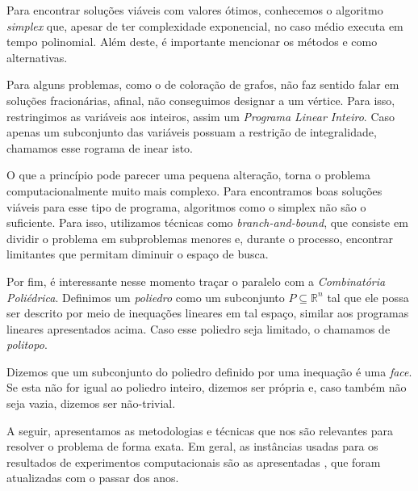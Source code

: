\documentclass[11pt]{article}
\providecommand{\DIFaddtex}[1]{{\protect\color{blue}{#1}}} %
\providecommand{\DIFaddbegin}{} %
\providecommand{\DIFaddend}{} %
\providecommand{\DIFadd}[1]{\texorpdfstring{\DIFaddtex{#1}}{#1}} %
\newcommand{\DIFaddincludegraphics}[2][]{{\color{blue}\fbox{\DIFOincludegraphics[#1]{#2}}}} %
\DeclareRobustCommand{\DIFaddbegin}{\DIFOaddbegin \let\includegraphics\DIFaddincludegraphics} %
\DeclareRobustCommand{\DIFaddend}{\DIFOaddend \let\includegraphics\DIFOincludegraphics} %
\begin{document}
Para encontrar soluções viáveis com valores ótimos, conhecemos o algoritmo \emph{simplex} que, apesar de ter complexidade exponencial, no caso médio executa em tempo polinomial\DIFaddbegin \DIFadd{~}\DIFaddend \autocite{Borgwardt1986SimplexMethodAlgorithms}.
Além deste, é importante mencionar os métodos  \DIFaddbegin \DIFadd{dos pontos interiores }\DIFaddend \autocite{Karmarkar1984newpolynomialtime} e  \DIFaddbegin \DIFadd{elipsoide~}\DIFaddend \autocite{Bland1981FeatureArticleTheEllipsoid} como alternativas.

Para alguns problemas, como o de coloração de grafos, não faz sentido falar em soluções fracionárias, afinal, não conseguimos designar \DIFaddbegin \DIFadd{``meia cor'' }\DIFaddend a um vértice.
Para isso, restringimos as variáveis aos inteiros,  \DIFaddbegin \DIFadd{tornando-o }\DIFaddend assim um \emph{Programa Linear Inteiro}. Caso apenas um subconjunto das variáveis possuam a restrição de integralidade, chamamos esse \DIFaddbegin\DIFadd{P}\DIFaddend rograma de \DIFaddbegin\DIFadd{L}\DIFaddend inear \DIFaddbegin\DIFadd{M}\DIFaddend isto.

O que a princípio pode parecer uma pequena alteração, torna o problema computacionalmente muito mais complexo.
Para encontramos boas soluções viáveis para esse tipo de programa, algoritmos como o simplex não são o suficiente.
Para isso, utilizamos técnicas como \emph{branch-and-bound}, que consiste em dividir o problema em subproblemas menores e, durante o processo, encontrar limitantes que permitam diminuir o espaço de busca.

Por fim, é interessante nesse momento traçar o paralelo com a \emph{Combinatória Poliédrica}.
Definimos um \emph{poliedro} como um subconjunto \(P \subseteq \mathbb{R}^n\) tal que ele possa ser descrito por meio de inequações lineares em tal espaço, similar aos programas lineares apresentados acima.
Caso esse poliedro seja limitado, o chamamos de \emph{politopo}.

Dizemos que um subconjunto do poliedro definido por uma inequação é uma \emph{face}.
Se esta não for igual ao poliedro inteiro, dizemos ser própria e, caso também não seja vazia, dizemos ser não-trivial.
\DIFaddbegin \DIFadd{Uma }\emph{\DIFadd{faceta}} \DIFadd{é uma face própria maximal, ou seja, uma face própria que não está contida em nenhuma outra.
}\DIFaddend 

A seguir, apresentamos as metodologias e técnicas que nos são relevantes para resolver o problema de forma exata.
Em geral, as instâncias usadas para os resultados de experimentos computacionais são as apresentadas  \DIFaddbegin \DIFadd{em \mbox{%
\textcite{DIMACSGraphColoringInstances}}\hskip0pt%
}\DIFaddend , que foram atualizadas com o passar dos anos.
\end{document}
